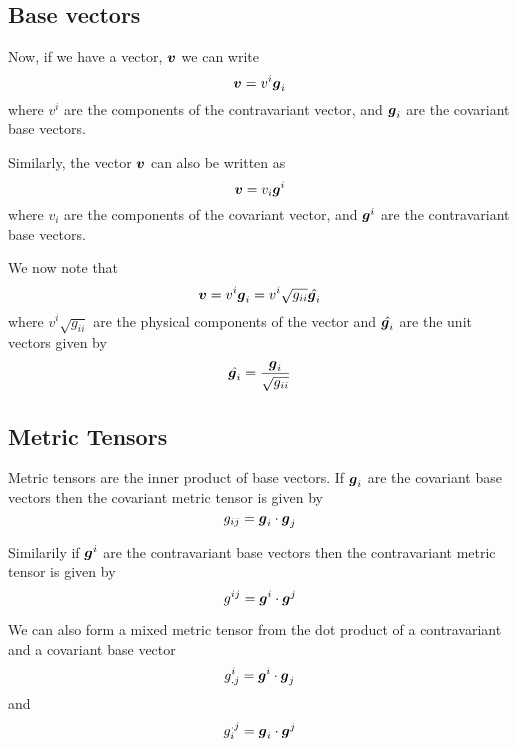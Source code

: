 \subsection{Base vectors}

Now, if we have a vector, $ \boldsymbol{v} $ we can write
\begin{equation}
   \boldsymbol{v} =v^{i} \boldsymbol{g} _{i}
\end{equation}
where $v^{i}$ are the components of the contravariant vector, and
$ \boldsymbol{g} _{i}$ are the covariant base vectors.

Similarly, the vector $ \boldsymbol{v} $ can also be written as 
\begin{equation}
   \boldsymbol{v} =v_{i} \boldsymbol{g} ^{i}
\end{equation}
where $v_{i}$ are the components of the covariant vector, and
$ \boldsymbol{g} ^{i}$ are the contravariant base vectors. 

We now note that
\begin{equation}
   \boldsymbol{v} =v^{i} \boldsymbol{g} _{i}=v^{i}\sqrt{g_{ii}}\hat{ \boldsymbol{g} _{i}}
\end{equation}
where $v^{i}\sqrt{g_{ii}}$ are the physical components of the vector and
$\hat{ \boldsymbol{g} _{i}}$ are the unit vectors given by
\begin{equation}
  \hat{ \boldsymbol{g} _{i}}=\dfrac{ \boldsymbol{g} _{i}}{\sqrt{g_{ii}}}
\end{equation}

\subsection{Metric Tensors}
\label{sec:metric tensors}

Metric tensors are the inner product of base vectors. If $ \boldsymbol{g} _{i}$ are the
covariant base vectors then the covariant metric tensor is given by
\begin{equation}
  g_{ij}=  \boldsymbol{g} _{i}  \cdot   \boldsymbol{g} _{j} 
\end{equation}

Similarily if $ \boldsymbol{g} ^{i}$ are the contravariant base vectors then the
contravariant metric tensor is given by 
\begin{equation}
  g^{ij}=  \boldsymbol{g} ^{i}  \cdot   \boldsymbol{g} ^{j} 
\end{equation}

We can also form a mixed metric tensor from the dot product of a contravariant
and a covariant base vector \ie
\begin{equation}
  g^{i}_{.j}=  \boldsymbol{g} ^{i}  \cdot   \boldsymbol{g} _{j} 
\end{equation}
and 
\begin{equation}
  g_{i}^{.j}=  \boldsymbol{g} _{i}  \cdot   \boldsymbol{g} ^{j} 
\end{equation}

